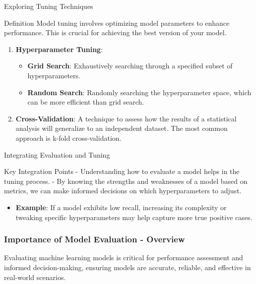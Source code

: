 \documentclass[aspectratio=169]{beamer}
\begin{document}
\begin{frame}[fragile]{Exploring Tuning Techniques}
    \begin{block}{Definition}
        Model tuning involves optimizing model parameters to enhance performance. This is crucial for achieving the best version of your model.
    \end{block}
    
    \begin{enumerate}
        \item \textbf{Hyperparameter Tuning}:
        \begin{itemize}
            \item \textbf{Grid Search}: Exhaustively searching through a specified subset of hyperparameters.
            \item \textbf{Random Search}: Randomly searching the hyperparameter space, which can be more efficient than grid search.
        \end{itemize}
        
        \item \textbf{Cross-Validation}:
        A technique to assess how the results of a statistical analysis will generalize to an independent dataset. The most common approach is k-fold cross-validation.
    \end{enumerate}
\end{frame}

\begin{frame}[fragile]{Integrating Evaluation and Tuning}
    \begin{block}{Key Integration Points}
        - Understanding how to evaluate a model helps in the tuning process.
        - By knowing the strengths and weaknesses of a model based on metrics, we can make informed decisions on which hyperparameters to adjust.
    \end{block}
    
    \begin{itemize}
        \item \textbf{Example}: If a model exhibits low recall, increasing its complexity or tweaking specific hyperparameters may help capture more true positive cases.
    \end{itemize}
\end{frame}

\begin{frame}[fragile]
  \frametitle{Importance of Model Evaluation - Overview}
  Evaluating machine learning models is critical for performance assessment and informed decision-making, ensuring models are accurate, reliable, and effective in real-world scenarios.
\end{frame}
\end{document}
